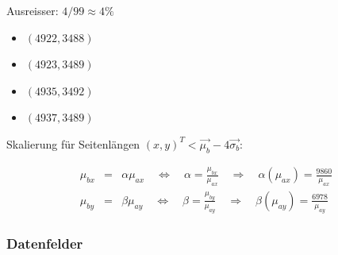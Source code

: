 \vspace*{-0cm}
Ausreisser: $4/99 \approx 4 \%$

\begin{scriptsize}
\begin{itemize}
\setlength\itemsep{-0.1em}
\item $(4922, 3488)$ 
\item $(4923, 3489)$ 
\item $(4935, 3492)$ 
\item $(4937, 3489)$ 
\end{itemize}
\end{scriptsize}



Skalierung für Seitenlängen $(x,y)^T < \vec{\mu_b} - 4\vec{\sigma_b}$:

\begin{eqnarray}
\mu_{bx}	&=& \alpha\mu_{ax}
\quad\Leftrightarrow\quad \alpha = \frac{\mu_{bx}}{\mu_{ax}}
\quad\Rightarrow\quad\alpha (\mu_{ax}) = \frac{9860}{\mu_{ax}}\\
\mu_{by}	&=& \beta\mu_{ay}
\quad\Leftrightarrow\quad \beta = \frac{\mu_{by}}{\mu_{ay}}
\quad\Rightarrow\quad\beta (\mu_{ay}) = \frac{6978}{\mu_{ay}}
\end{eqnarray}








\subsubsection{Datenfelder}
\vspace*{0cm}

